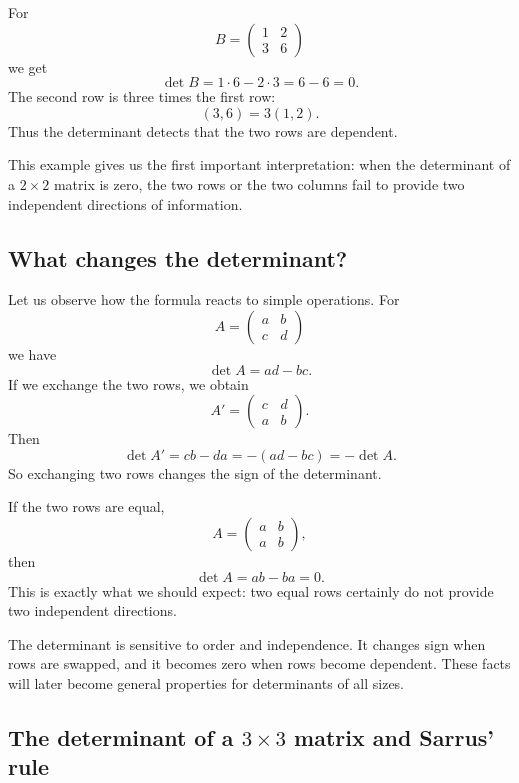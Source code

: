 \begin{examplebox}
For
\[
B=\begin{pmatrix}1&2\\3&6\end{pmatrix}
\]
we get
\[
\det B=1\cdot6-2\cdot3=6-6=0.
\]
The second row is three times the first row:
\[
(3,6)=3(1,2).
\]
Thus the determinant detects that the two rows are dependent.
\end{examplebox}

This example gives us the first important interpretation: when the determinant of a \(2\times2\) matrix is zero, the two rows or the two columns fail to provide two independent directions of information.

\subsection{What changes the determinant?}

Let us observe how the formula reacts to simple operations. For
\[
A=\begin{pmatrix}a&b\\c&d\end{pmatrix}
\]
we have
\[
\det A=ad-bc.
\]
If we exchange the two rows, we obtain
\[
A'=\begin{pmatrix}c&d\\a&b\end{pmatrix}.
\]
Then
\[
\det A'=cb-da=-(ad-bc)=-\det A.
\]
So exchanging two rows changes the sign of the determinant.

If the two rows are equal,
\[
A=\begin{pmatrix}a&b\\a&b\end{pmatrix},
\]
then
\[
\det A=ab-ba=0.
\]
This is exactly what we should expect: two equal rows certainly do not provide two independent directions.

\begin{remarkbox}
The determinant is sensitive to order and independence. It changes sign when rows are swapped, and it becomes zero when rows become dependent. These facts will later become general properties for determinants of all sizes.
\end{remarkbox}

\subsection{The determinant of a \(3\times3\) matrix and Sarrus' rule}

